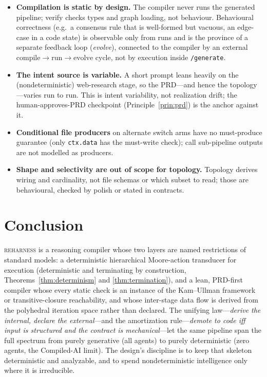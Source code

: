 \documentclass[11pt]{article}
\theoremstyle{plain}
\theoremstyle{definition}
\theoremstyle{remark}
\newcommand{\reharness}{\textsc{reharness}}
\newcommand{\code}[1]{\texttt{#1}}
\newcommand{\state}[1]{\textsf{#1}}
\begin{document}
\begin{itemize}[nosep]
  \item \textbf{Compilation is static by design.} The compiler never runs the
        generated pipeline; \state{verify} checks types and graph loading, not
        behaviour. Behavioural correctness (e.g.\ a consensus rule that is
        well-formed but vacuous, an edge-case in a code state) is observable only
        from runs and is the province of a separate feedback loop (\emph{evolve}),
        connected to the compiler by an external $\text{compile} \to \text{run} \to
        \text{evolve}$ cycle, not by execution inside \code{/generate}.
  \item \textbf{The intent source is variable.} A short prompt leans heavily on the
        (nondeterministic) web-research stage, so the PRD---and hence the
        topology---varies run to run. This is intent variability, not realization
        drift; the human-approves-PRD checkpoint (Principle~\ref{prin:prd}) is the
        anchor against it.
  \item \textbf{Conditional file producers} on alternate \state{switch} arms have no
        must-produce guarantee (only \code{ctx.data} has the must-write check);
        \state{call} sub-pipeline outputs are not modelled as producers.
  \item \textbf{Shape and selectivity are out of scope for topology.} Topology
        derives wiring and cardinality, not file schemas or which subset to read;
        those are behavioural, checked by \state{polish} or stated in contracts.
\end{itemize}

\section{Conclusion}

\reharness{} is a reasoning compiler whose two layers are named restrictions of
standard models: a deterministic hierarchical Moore-action transducer for execution
(deterministic and terminating by construction, Theorems~\ref{thm:determinism} and
\ref{thm:termination}), and a lean, PRD-first compiler whose every static check is
an instance of the Kam--Ullman framework or transitive-closure reachability, and
whose inter-stage data flow is derived from the polyhedral iteration space rather
than declared. The unifying law---\emph{derive the internal, declare the
external}---and the amortization rule---\emph{demote to code iff input is structured
and the contract is mechanical}---let the same pipeline span the full spectrum from
purely generative (all agents) to purely deterministic (zero agents, the Compiled-AI
limit). The design's discipline is to keep that skeleton deterministic and
analyzable, and to spend nondeterministic intelligence only where it is irreducible.
\end{document}
